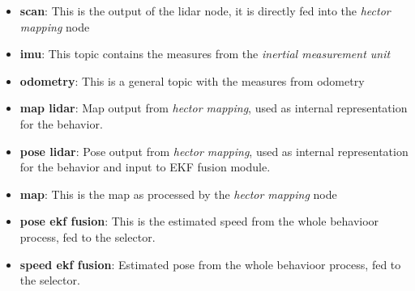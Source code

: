 \begin{itemize}
  \item \textbf{scan}: This is the output of the lidar node, it is directly fed into the \textit{hector mapping} node
  \item \textbf{imu}: This topic contains the measures from the \textit{inertial measurement unit}
  \item \textbf{odometry}: This is a general topic with the measures from odometry
  \item \textbf{map lidar}: Map output from \textit{hector mapping}, used as internal representation for the behavior.
  \item \textbf{pose lidar}: Pose output from \textit{hector mapping}, used as internal representation for the behavior and input to EKF fusion module.
  \item \textbf{map}: This is the map as processed by the \textit{hector mapping} node
  \item \textbf{pose ekf fusion}: This is the estimated speed from the whole behavioor process, fed to the selector.
  \item \textbf{speed ekf fusion}: Estimated pose from the whole behavioor process, fed to the selector.
\end{itemize}
